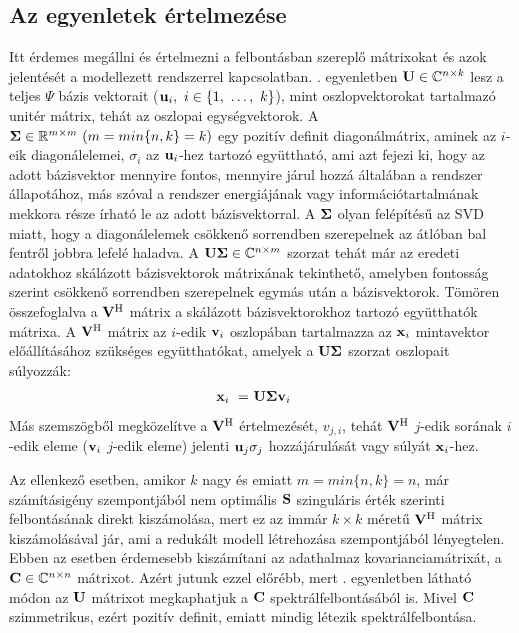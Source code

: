         \subsection{Az egyenletek értelmezése}
            Itt érdemes megállni és értelmezni a felbontásban szereplő mátrixokat és azok jelentését a modellezett rendszerrel kapcsolatban. . egyenletben ${\bf U} \in \mathbb{C}^{n\times k}$ lesz a teljes $\Psi$ bázis vektorait (${\bf u}_i,~i \in \{1,~\hdots,~k\}$), mint oszlopvektorokat tartalmazó unitér mátrix, tehát az oszlopai egységvektorok. A ${\bf \Sigma} \in \mathbb{R}^{m\times m}~(m=min\{n,k\}=k)$ egy pozitív definit diagonálmátrix, aminek az $i$-eik diagonálelemei, $\sigma_i$ az ${\bf u}_i$-hez tartozó együttható, ami azt fejezi ki, hogy az adott bázisvektor mennyire fontos, mennyire járul hozzá általában a rendszer állapotához, más szóval a rendszer energiájának vagy információtartalmának mekkora része írható le az adott bázisvektorral. A ${\bf \Sigma}$ olyan felépítésű az SVD miatt, hogy a diagonálelemek csökkenő sorrendben szerepelnek az átlóban bal fentről jobbra lefelé haladva. A ${\bf U\Sigma} \in \mathbb{C}^{n\times m}$ szorzat tehát már az eredeti adatokhoz skálázott bázisvektorok mátrixának tekinthető, amelyben fontosság szerint csökkenő sorrendben szerepelnek egymás után a bázisvektorok. Tömören összefoglalva a ${\bf V^{\mathrm{H}}}$ mátrix a skálázott bázisvektorokhoz tartozó együtthatók mátrixa. A ${\bf V^{\mathrm{H}}}$ mátrix az $i$-edik ${\bf v}_i$ oszlopában tartalmazza az ${\bf x}_i$ mintavektor előállításához szükséges együtthatókat, amelyek a ${\bf U\Sigma}$ szorzat oszlopait súlyozzák:
            \begin{align}
                {\bf x}_i~=&~{\bf U\Sigma v}_i
            \end{align}
            Más szemszögből megközelítve a ${\bf V^{\mathrm{H}}}$ értelmezését, $v_{j,i}$, tehát ${\bf V^{\mathrm{H}}}$ $j$-edik sorának $i$-edik eleme (${\bf v}_i$ $j$-edik eleme) jelenti ${\bf u}_j \sigma_j$ hozzájárulását vagy súlyát ${\bf x}_i$-hez.
            \par
            Az ellenkező esetben, amikor $k$ nagy és emiatt $m=min\{n,k\}=n$, már számításigény szempontjából nem optimális ${\bf S}$ szinguláris érték szerinti felbontásának direkt kiszámolása, mert ez az immár $k \times k$ méretű ${\bf V^{\mathrm{H}}}$ mátrix kiszámolásával jár, ami a redukált modell létrehozása szempontjából lényegtelen. Ebben az esetben érdemesebb kiszámítani az adathalmaz kovarianciamátrixát, a ${\bf C} \in \mathbb{C}^{n \times n}$ mátrixot. Azért jutunk ezzel előrébb, mert . egyenletben látható módon az ${\bf U}$ mátrixot megkaphatjuk a ${\bf C}$ spektrálfelbontásából is. Mivel ${\bf C}$ szimmetrikus, ezért pozitív definit, emiatt mindig létezik spektrálfelbontása.
